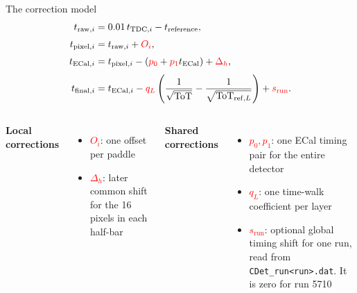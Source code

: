 \documentclass[aspectratio=169,10pt]{beamer}
\begin{document}
\begin{frame}{The correction model}
\small
\begin{align*}
t_{\mathrm{raw},i} &= 0.01\,t_{\mathrm{TDC},i}-t_{\mathrm{reference}},\\[1mm]
t_{\mathrm{pixel},i} &= t_{\mathrm{raw},i}+\textcolor{red}{O_i},\\[1mm]
t_{\mathrm{ECal},i} &= t_{\mathrm{pixel},i}
-(\textcolor{red}{p_0}+\textcolor{red}{p_1}t_{\mathrm{ECal}})
+\textcolor{red}{\Delta_h},\\[1mm]
t_{\mathrm{final},i} &= t_{\mathrm{ECal},i}
-\textcolor{red}{q_{L}}\left(\frac{1}{\sqrt{\mathrm{ToT}}}
-\frac{1}{\sqrt{\mathrm{ToT}_{\mathrm{ref},L}}}\right)
+\textcolor{red}{s_{\mathrm{run}}}.
\end{align*}
\vspace{0.05cm}
\begin{columns}[T,onlytextwidth]
  \textbf{Local corrections}
  \begin{itemize}
    \item \textcolor{red}{$O_i$}: one offset per paddle
    \item \textcolor{red}{$\Delta_h$}: later common shift for the 16 pixels in each half-bar
  \end{itemize}
  \textbf{Shared corrections}
  \begin{itemize}
    \item \textcolor{red}{$p_0,p_1$}: one ECal timing pair for the entire detector
    \item \textcolor{red}{$q_L$}: one time-walk coefficient per layer
    \item \textcolor{red}{$s_{\mathrm{run}}$}: optional global timing shift for one run, read from \texttt{CDet\_run<run>.dat}. It is zero for run 5710
  \end{itemize}
\end{columns}
\end{frame}
\end{document}

